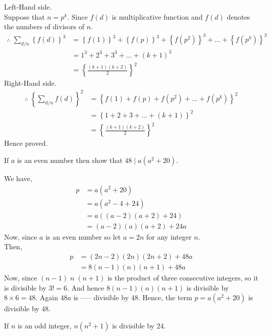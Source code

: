 \documentclass[12pt,class=book,crop=false]{standalone}
\begin{document}
\begin{soln}
    \hfill\newline
    Left-Hand side.\\
    Suppose that $ n=p^k $. Since $ f(d) $ is multiplicative function and $ f(d) $ denotes the numbers of divisors of $ n $.
    \begin{align*}
        \therefore\; \sum_{d/n}\left\{ f(d) \right\}^3&=\left\{ f(1) \right\}^3+\left\{ f(p) \right\}^3+\left\{ f(p^2) \right\}^3+\dots+\left\{ f(p^k) \right\}^3\\
        &=1^3+2^3+3^3+\dots+(k+1)^3\\
        &=\left\{ \frac{(k+1)(k+2)}{2} \right\}^2
    \end{align*}
    Right-Hand side.\\
    \begin{align*}
        \therefore\; \left\{\sum_{d/n} f(d) \right\}^2&=\left\{ f(1) +f(p)+f(p^2) +\dots+f(p^k) \right\}^2\\
        &=\left\{1+2+3+\dots+(k+1)\right\}^2\\
        &=\left\{ \frac{(k+1)(k+2)}{2} \right\}^2
    \end{align*}
    Hence proved.
\end{soln}
\begin{qn}
    If $ a $ is an even number then show that $ 48\mid a(a^2+20) $.
\end{qn}
\begin{soln}
    We have,
    \begin{align*}
        p&=a\left(a^2+20\right)\\
        &=a\left(a^2-4+24\right)\\
        &=a\left((a-2)(a+2)+24\right)\\
        &=(a-2)(a)(a+2)+24a
    \end{align*}
    Now, since $ a $ is an even number so let $ a=2n $ for any integer $ n $.\\
    Then, 
    \begin{align*}
        p&=(2n-2)(2n)(2n+2)+48a\\
        &=8(n-1)(n)(n+1)+48a
    \end{align*}
    Now, since $ (n-1)\;n\;(n+1) $ is the product of three consecutive integers, so it is divisible by $ 3!=6 $. And hence $ 8(n-1)(n)(n+1) $ is divisible by $ 8\times 6=48 $. Again $ 48a $ is ----- divisible by 48. Hence, the term $ p=a(a^2+20) $ is divisible by 48.
\end{soln}
\begin{qn}
    If $ n $ is an odd integer, $ n(n^2+1) $ is divisible by 24.
\end{qn}
\end{document}
